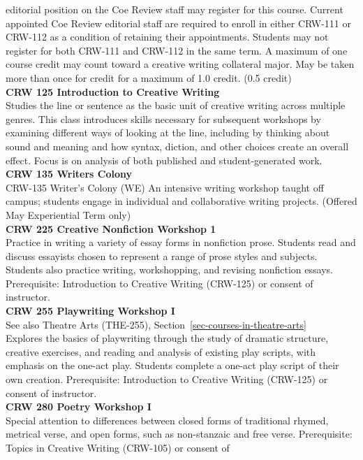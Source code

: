\documentclass[
  letterpaper,
]{scrbook}
\begin{document}
editorial position on the Coe Review staff may register for this course.
Current appointed Coe Review editorial staff are required to enroll in
either CRW-111 or CRW-112 as a condition of retaining their
appointments. Students may not register for both CRW-111 and CRW-112 in
the same term. A maximum of one course credit may count toward a
creative writing collateral major. May be taken more than once for
credit for a maximum of 1.0 credit. (0.5 credit)\\
\textbf{CRW 125 Introduction to Creative Writing}\\
Studies the line or sentence as the basic unit of creative writing
across multiple genres. This class introduces skills necessary for
subsequent workshops by examining different ways of looking at the line,
including by thinking about sound and meaning and how syntax, diction,
and other choices create an overall effect. Focus is on analysis of both
published and student-generated work.\\
\textbf{CRW 135 Writers Colony}\\
CRW-135 Writer's Colony (WE) An intensive writing workshop taught off
campus; students engage in individual and collaborative writing
projects. (Offered May Experiential Term only)\\
\textbf{CRW 225 Creative Nonfiction Workshop 1}\\
Practice in writing a variety of essay forms in nonfiction prose.
Students read and discuss essayists chosen to represent a range of prose
styles and subjects. Students also practice writing, workshopping, and
revising nonfiction essays. Prerequisite: Introduction to Creative
Writing (CRW-125) or consent of instructor.\\
\textbf{CRW 255 Playwriting Workshop I}\\
See also Theatre Arts (THE-255),
Section~\ref{sec-courses-in-theatre-arts}\\
Explores the basics of playwriting through the study of dramatic
structure, creative exercises, and reading and analysis of existing play
scripts, with emphasis on the one-act play. Students complete a one-act
play script of their own creation. Prerequisite: Introduction to
Creative Writing (CRW-125) or consent of instructor.\\
\textbf{CRW 280 Poetry Workshop I}\\
Special attention to differences between closed forms of traditional
rhymed, metrical verse, and open forms, such as non-stanzaic and free
verse. Prerequisite: Topics in Creative Writing (CRW-105) or consent of
\end{document}
